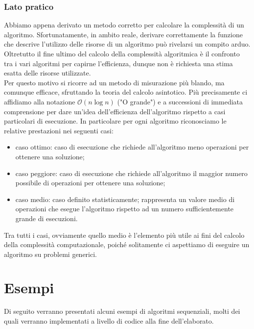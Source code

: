\subsection{Lato pratico}
Abbiamo appena derivato un metodo corretto per calcolare la complessità di un algoritmo. Sfortunatamente, in ambito reale, derivare correttamente la funzione che descrive l'utilizzo delle risorse di un algoritmo può rivelarsi un compito arduo. Oltretutto il fine ultimo del calcolo della complessità algoritmica è il confronto tra i vari algoritmi per capirne l'efficienza, dunque non è richiesta una stima esatta delle risorse utilizzate.\\
Per questo motivo si ricorre ad un metodo di misurazione più blando, ma comunque efficace, sfruttando la teoria del calcolo asintotico. Più precisamente ci affidiamo alla notazione $\mathcal{O}(n \log {}n)$ ("O grande") e a successioni di immediata comprensione per dare un'idea dell'efficienza dell'algoritmo rispetto a casi particolari di esecuzione. In particolare per ogni algoritmo riconosciamo le relative prestazioni nei seguenti casi:
\begin{itemize}
\item{caso ottimo: caso di esecuzione che richiede all'algoritmo meno operazioni per ottenere una soluzione;}
\item{caso peggiore: caso di esecuzione che richiede all'algoritmo il maggior numero possibile di operazioni per ottenere una soluzione;}
\item{caso medio: caso definito statisticamente; rappresenta un valore medio di operazioni che esegue l'algoritmo rispetto ad un numero sufficientemente grande di esecuzioni.}
\end{itemize}
Tra tutti i casi, ovviamente quello medio è l'elemento più utile ai fini del calcolo della complessità computazionale, poiché solitamente ci aspettiamo di eseguire un algoritmo su problemi generici.
\chapter{Esempi}
Di seguito verranno presentati alcuni esempi di algoritmi sequenziali, molti dei quali verranno implementati a livello di codice alla fine dell'elaborato.
